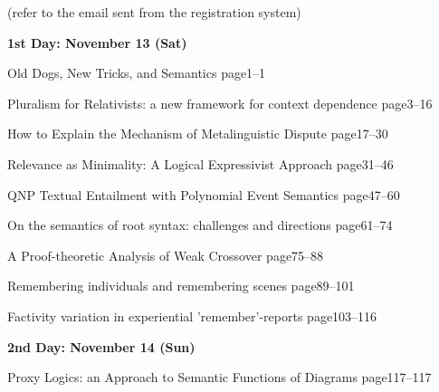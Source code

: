 \documentclass[12pt]{jarticle}
\begin{document}
(refer to the email sent from the registration system)


\noindent\textbf{\large 
1st Day: November 13 (Sat)
}\\







  
     {Old Dogs, New Tricks, and Semantics}
     {page1--1}




  
     {Pluralism for Relativists: a new framework for context dependence}
     {page3--16}
  
     {How to Explain the Mechanism of Metalinguistic Dispute}
     {page17--30}
  
     {Relevance as Minimality: A Logical Expressivist Approach}
     {page31--46}




  
     {QNP Textual Entailment with Polynomial Event Semantics}
     {page47--60}
  
     {On the semantics of root syntax: challenges and directions}
     {page61--74}
  
     {A Proof-theoretic Analysis of Weak Crossover}
     {page75--88}




  
  
     {Remembering individuals and remembering scenes}
     {page89--101}
  
     {Factivity variation in experiential 'remember'-reports}
     {page103--116}




\noindent\textbf{\large 
2nd Day: November 14 (Sun)
}\\




  
     {Proxy Logics: an Approach to Semantic Functions of Diagrams}
     {page117--117}
\end{document}

